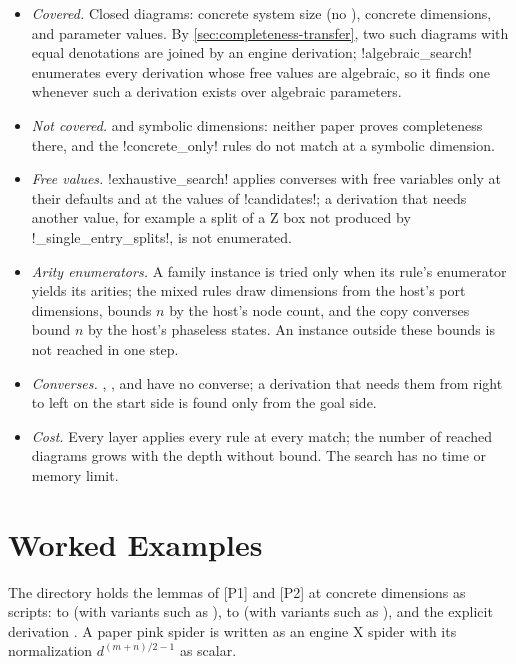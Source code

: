 \begin{itemize}
\item \emph{Covered.} Closed diagrams: concrete system size (no \bbox{}), concrete dimensions, and
  parameter values. By \cref{sec:completeness-transfer}, two such diagrams with equal denotations
  are joined by an engine derivation; \py!algebraic_search! enumerates every derivation whose free
  values are algebraic, so it finds one whenever such a derivation exists over algebraic
  parameters.
\item \emph{Not covered.} \bboxes{} and symbolic dimensions: neither paper proves completeness
  there, and the \py!concrete_only! rules do not match at a symbolic dimension.
\item \emph{Free values.} \py!exhaustive_search! applies converses with free variables only at
  their defaults and at the values of \py!candidates!; a derivation that needs another value, for
  example a split of a Z box not produced by \py!_single_entry_splits!, is not enumerated.
\item \emph{Arity enumerators.} A family instance is tried only when its rule's enumerator yields
  its arities; the mixed rules draw dimensions from the host's port dimensions, 
  bounds $n$ by the host's node count, and the copy converses bound $n$ by the host's phaseless
  states. An instance outside these bounds is not reached in one step.
\item \emph{Converses.} , , and
   have no converse; a derivation that needs them from right to left on the
  start side is found only from the goal side.
\item \emph{Cost.} Every layer applies every rule at every match; the number of reached diagrams
  grows with the depth without bound. The search has no time or memory limit.
\end{itemize}

\section{Worked Examples}\label{sec:completeness-examples}

The directory  holds the lemmas of [P1] and [P2] at concrete
dimensions as scripts:  to  (with variants
such as ),  to  (with variants such as ), and
the explicit derivation . A paper pink spider is
written as an engine X spider with its normalization $d^{(m+n)/2-1}$ as scalar.

